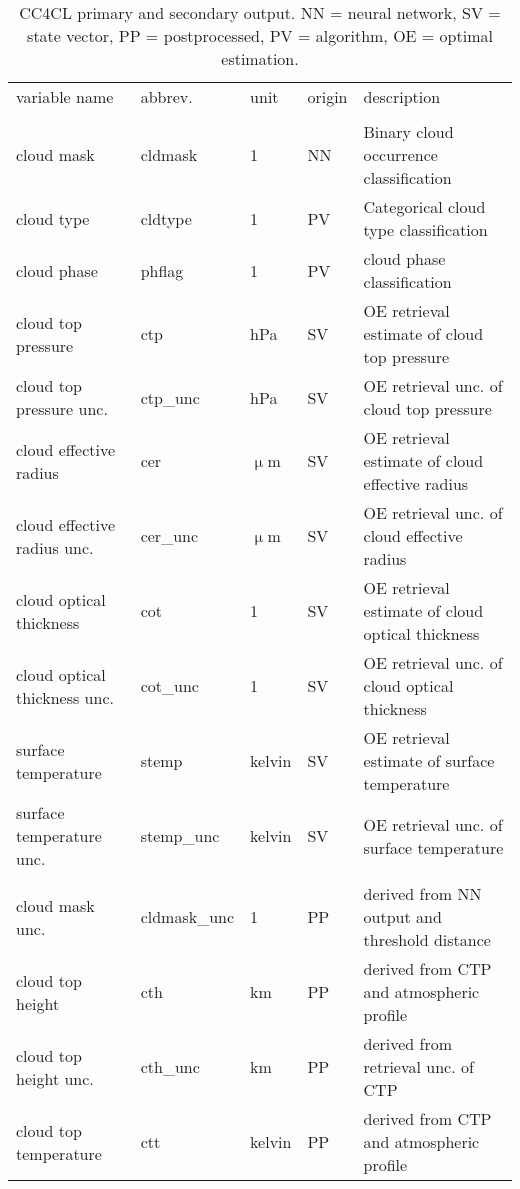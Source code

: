 \begin{table*}[h]
  \caption{CC4CL primary and secondary output. NN = neural network, SV = state vector, PP = postprocessed, PV = \citet{Pavolonis05} algorithm, OE = optimal estimation.}
  \begin{tabular}{l|l|l|l|l}
    \tophline
    variable name & abbrev. & unit & origin & description \\
    \middlehline
    \multicolumn{5}{c}{primary variables} \\
    \middlehline
    cloud mask & cldmask & 1 & NN & Binary cloud occurrence classification \\
    cloud type & cldtype & 1 & PV & Categorical cloud type classification \\
    cloud phase & phflag & 1 & PV &  cloud phase classification \\
    cloud top pressure & ctp & hPa & SV & OE retrieval estimate of cloud top pressure \\
    cloud top pressure unc. & ctp\_unc & hPa & SV & OE retrieval unc. of cloud top pressure \\
    cloud effective radius & cer & $\upmu$m & SV & OE retrieval estimate of cloud effective radius \\
    cloud effective radius unc. & cer\_unc & $\upmu$m & SV & OE retrieval unc. of cloud effective radius\\
    cloud optical thickness & cot & 1 & SV & OE retrieval estimate of cloud optical thickness \\
    cloud optical thickness unc. & cot\_unc & 1 & SV & OE retrieval unc. of cloud optical thickness \\
    surface temperature & stemp & kelvin & SV & OE retrieval estimate of surface temperature \\
    surface temperature unc. & stemp\_unc & kelvin & SV & OE retrieval unc. of surface temperature\\
    \middlehline
    \multicolumn{5}{c}{secondary variables} \\
    \middlehline
    cloud mask unc. & cldmask\_unc & 1 & PP & derived from NN output and threshold distance \\
    cloud top height & cth & km & PP & derived from CTP and atmospheric profile \\
    cloud top height unc. & cth\_unc & km & PP & derived from retrieval unc. of CTP \\
    cloud top temperature & ctt & kelvin & PP & derived from CTP and atmospheric profile \\

\end{tabular}
\end{table*}

